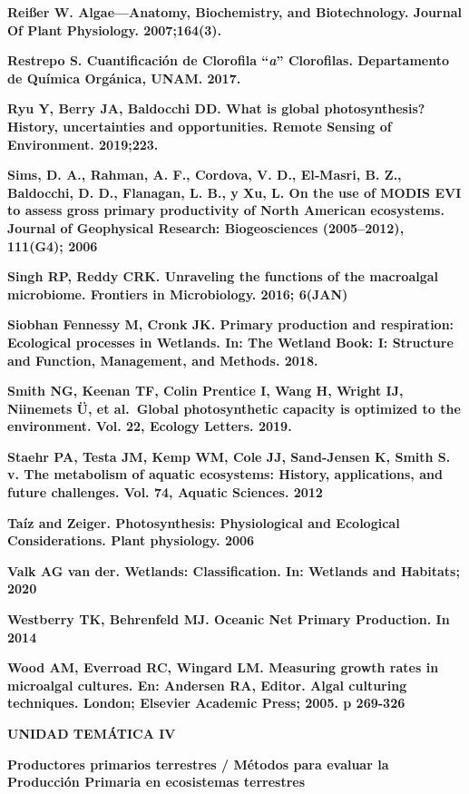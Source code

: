\documentclass[
]{article}
\begin{document}
\textbf{Reißer W. Algae---Anatomy, Biochemistry, and Biotechnology.
Journal Of Plant Physiology. 2007;164(3).}

\textbf{Restrepo S. Cuantificación de Clorofila ``\emph{a}'' Clorofilas.
Departamento de Química Orgánica, UNAM. 2017.}

\textbf{Ryu Y, Berry JA, Baldocchi DD. What is global photosynthesis?
History, uncertainties and opportunities. Remote Sensing of Environment.
2019;223.}

\textbf{Sims, D. A., Rahman, A. F., Cordova, V. D., El‐Masri, B. Z.,
Baldocchi, D. D., Flanagan, L. B., y Xu, L. On the use of MODIS EVI to
assess gross primary productivity of North American ecosystems. Journal
of Geophysical Research: Biogeosciences (2005--2012), 111(G4); 2006}

\textbf{Singh RP, Reddy CRK. Unraveling the functions of the macroalgal
microbiome. Frontiers in Microbiology. 2016; 6(JAN)}

\textbf{Siobhan Fennessy M, Cronk JK. Primary production and
respiration: Ecological processes in Wetlands. In: The Wetland Book: I:
Structure and Function, Management, and Methods. 2018.}

\textbf{Smith NG, Keenan TF, Colin Prentice I, Wang H, Wright IJ,
Niinemets Ü, et al.~Global photosynthetic capacity is optimized to the
environment. Vol. 22, Ecology Letters. 2019.}

\textbf{Staehr PA, Testa JM, Kemp WM, Cole JJ, Sand-Jensen K, Smith S.
v. The metabolism of aquatic ecosystems: History, applications, and
future challenges. Vol. 74, Aquatic Sciences. 2012}

\textbf{Taíz and Zeiger. Photosynthesis: Physiological and Ecological
Considerations. Plant physiology. 2006}

\textbf{Valk AG van der. Wetlands: Classification. In: Wetlands and
Habitats; 2020}

\textbf{Westberry TK, Behrenfeld MJ. Oceanic Net Primary Production. In
2014}

\textbf{Wood AM, Everroad RC, Wingard LM. Measuring growth rates in
microalgal cultures. En: Andersen RA, Editor. Algal culturing
techniques. London; Elsevier Academic Press; 2005. p 269-326}

\textbf{\hfill\break
}

\textbf{UNIDAD TEMÁTICA IV}

\textbf{Productores primarios terrestres / Métodos para evaluar la
Producción Primaria en ecosistemas terrestres}
\end{document}
